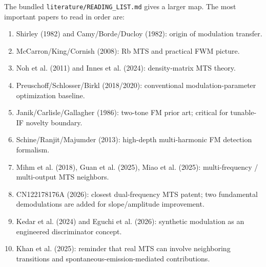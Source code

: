 \documentclass[10pt]{article}
\begin{document}
The bundled \texttt{literature/READING\_LIST.md} gives a larger map. The most important papers to read in order are:
\begin{enumerate}
\item Shirley (1982) and Camy/Borde/Ducloy (1982): origin of modulation transfer.
\item McCarron/King/Cornish (2008): Rb MTS and practical FWM picture.
\item Noh et al. (2011) and Innes et al. (2024): density-matrix MTS theory.
\item Preuschoff/Schlosser/Birkl (2018/2020): conventional modulation-parameter optimization baseline.
\item Janik/Carlisle/Gallagher (1986): two-tone FM prior art; critical for tunable-IF novelty boundary.
\item Schine/Ranjit/Majumder (2013): high-depth multi-harmonic FM detection formalism.
\item Mihm et al. (2018), Guan et al. (2025), Miao et al. (2025): multi-frequency / multi-output MTS neighbors.
\item CN122178176A (2026): closest dual-frequency MTS patent; two fundamental demodulations are added for slope/amplitude improvement.
\item Kedar et al. (2024) and Eguchi et al. (2026): synthetic modulation as an engineered discriminator concept.
\item Khan et al. (2025): reminder that real MTS can involve neighboring transitions and spontaneous-emission-mediated contributions.
\end{enumerate}
\end{document}
